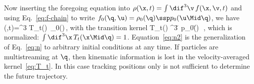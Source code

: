 Now inserting the foregoing equation into
$\rho(\x,t)=\int\dif^3\v\,f(\x,\v,t)$
and using Eq.~\eqref{eq:f-chain} to write
$f_0(\q,\u)=\rho_0(\q)\ssp p_0(\u\Mid\q)$, we have
\be\label{eq:n2}
\rho(\x,t)=\int\dif^3\q\; T_t(\x\Mid\q)\, \rho_0(\q)\,,
\ee
with the transition kernel
\be\label{eq:T_t}
T_t(\x\Mid\q)
\equiv\int\dif^3\u\, p_0(\u\Mid\q)\,
    \delD\big[\x-\x_t(\q,\u)\big]\,,
\ee
which is normalized: $\int\dif^3\x\, T_t(\x\Mid\q)=1$.
Equation~\eqref{eq:n2} is the generalization of Eq.~\eqref{eq:n}
to arbitrary initial conditions at any time.
If particles are multistreaming at $\q$,
then kinematic information is lost in the velocity-averaged
kernel~\eqref{eq:T_t}.
In this case tracking positions only is not sufficient to determine
the future trajectory.



